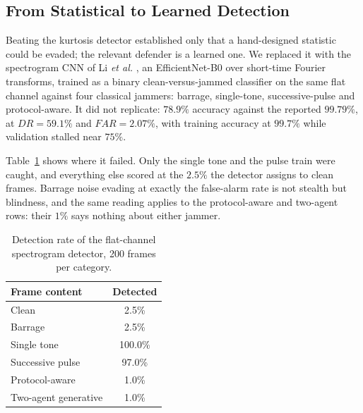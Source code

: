 %
%

\subsection{From Statistical to Learned Detection}
Beating the kurtosis detector established only that a hand-designed statistic could be evaded; the relevant defender is a learned one.
We replaced it with the spectrogram CNN of Li \emph{et al.} \cite{9707819}, an EfficientNet-B0 over short-time Fourier transforms, trained as a binary clean-versus-jammed classifier on the same flat channel against four classical jammers: barrage, single-tone, successive-pulse and protocol-aware.
It did not replicate: $78.9\%$ accuracy against the reported $99.79\%$, at $DR = 59.1\%$ and $FAR = 2.07\%$, with training accuracy at $99.7\%$ while validation stalled near $75\%$.

Table~\ref{tab:crosseval} shows where it failed.
Only the single tone and the pulse train were caught, and everything else scored at the $2.5\%$ the detector assigns to clean frames.
Barrage noise evading at exactly the false-alarm rate is not stealth but blindness, and the same reading applies to the protocol-aware and two-agent rows: their $1\%$ says nothing about either jammer.

\begin{table}[!t]
\renewcommand{\arraystretch}{1.3}
\caption{Detection rate of the flat-channel spectrogram detector, 200 frames per category.}
\label{tab:crosseval}
\centering
\begin{tabular}{l c}
\hline\hline
\textbf{Frame content} & \textbf{Detected} \\
\hline
Clean & 2.5\% \\
Barrage & 2.5\% \\
Single tone & 100.0\% \\
Successive pulse & 97.0\% \\
Protocol-aware & 1.0\% \\
Two-agent generative & 1.0\% \\
\hline\hline
\end{tabular}
\end{table}

